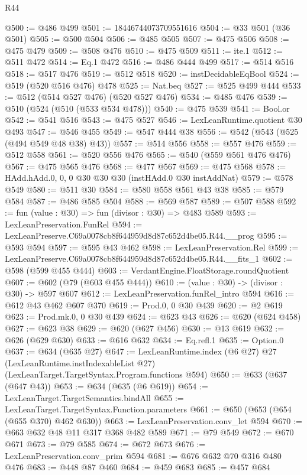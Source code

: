 \begin{lexlean}{R44}
\begin{coremodule}
@500 := @486 @499
@501 := 18446744073709551616
@504 := @33 @501 (@36 @501)
@505 := @500 @504
@506 := @485 @505
@507 := @475 @506
@508 := @475 @479
@509 := @508 @476
@510 := @475 @509
@511 := ite.{1}
@512 := @511 @472
@514 := Eq.{1} @472
@516 := @486 @444 @499
@517 := @514 @516
@518 := @517 @476
@519 := @512 @518
@520 := instDecidableEqBool
@524 := @519 (@520 @516 @476) @478
@525 := Nat.beq
@527 := @525 @499 @444
@533 := @512 (@514 @527 @476) (@520 @527 @476)
@534 := @485 @476
@539 := @510 (@524 (@510 (@533 @534 @478)))
@540 := @475 @539
@541 := Bool.or
@542 := @541 @516
@543 := @475 @527
@546 := LexLeanRuntime.quotient @30 @493
@547 := @546 @455
@549 := @547 @444 @38
@556 := @542 (@543 (@525 (@494 @549 @48 @38) @43))
@557 := @514 @556
@558 := @557 @476
@559 := @512 @558
@561 := @520 @556 @476
@565 := @540 (@559 @561 @476 @476)
@567 := @475 @565 @476
@568 := @477 @567
@569 := @475 @568
@578 := HAdd.hAdd.{0, 0, 0} @30 @30 @30 (instHAdd.{0} @30 instAddNat)
@579 := @578 @549
@580 := @511 @30
@584 := @580 @558 @561 @43 @38
@585 := @579 @584
@587 := @486 @585 @504
@588 := @569 @587
@589 := @507 @588
@592 := fun (value : @30) => fun (divisor : @30) => @483 @589
@593 := LexLeanPreservation.FunRel
@594 := LexLeanPreserve.C69a0078cb8f644959d8d87c652d4be05.R44.__prog
@595 := @593 @594
@597 := @595 @43 @462
@598 := LexLeanPreservation.Rel
@599 := LexLeanPreserve.C69a0078cb8f644959d8d87c652d4be05.R44.__fits_1
@602 := @598 (@599 @455 @444)
@603 := VerdantEngine.FloatStorage.roundQuotient
@607 := @602 (@79 (@603 @455 @444))
@610 := (value : @30) -> (divisor : @30) -> @597 @607
@612 := LexLeanPreservation.funRel_intro @594
@616 := @612 @43 @462 @607 @370
@619 := Prod.{0, 0} @30 @439
@620 := @2 @619
@623 := Prod.mk.{0, 0} @30 @439
@624 := @623 @43
@626 := @620 (@624 @458)
@627 := @623 @38
@629 := @620 (@627 @456)
@630 := @13 @619
@632 := @626 (@629 @630)
@633 := @616 @632
@634 := Eq.refl.{1}
@635 := Option.{0}
@637 := @634 (@635 @27)
@647 := LexLeanRuntime.index
    (@6 @27)
    @27
    (LexLeanRuntime.instIndexableList @27)
    (LexLeanTarget.TargetSyntax.Program.functions @594)
@650 := @633 (@637 (@647 @43))
@653 := @634 (@635 (@6 @619))
@654 := LexLeanTarget.TargetSemantics.bindAll
@655 := LexLeanTarget.TargetSyntax.Function.parameters
@661 := @650 (@653 (@654 (@655 @370) @462 @630))
@663 := LexLeanPreservation.conv_let @594
@670 := @663 @632 @48 @11 @317 @368 @482 @589
@671 := @79 @549
@672 := @670 @671
@673 := @79 @585
@674 := @672 @673
@676 := LexLeanPreservation.conv_prim @594
@681 := @676 @632 @70 @316 @480 @476
@683 := @448 @87 @460
@684 := @459 @683
@685 := @457 @684

\end{coremodule}
\end{lexlean}
